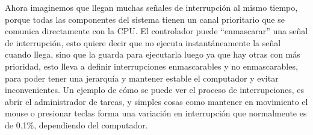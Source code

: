 \documentclass{letter}
\begin{document}
 Ahora imaginemos que llegan muchas señales de interrupción al mismo tiempo, porque todas las componentes del sistema tienen un canal prioritario que se comunica directamente con la CPU. El controlador puede “enmascarar” una señal de interrupción, esto quiere decir que no ejecuta instantáneamente la señal cuando llega, sino que la guarda para ejecutarla luego ya que hay otras con más prioridad, esto lleva a definir interrupciones enmascarables y no enmascarables, para poder tener una jerarquía y mantener estable el computador y evitar inconvenientes. Un ejemplo de cómo se puede ver el proceso de interrupciones, es abrir el administrador de tareas, y simples cosas como mantener en movimiento el mouse o presionar teclas forma una variación en interrupción que normalmente es de 0.1\%, dependiendo del computador.
\end{document}
